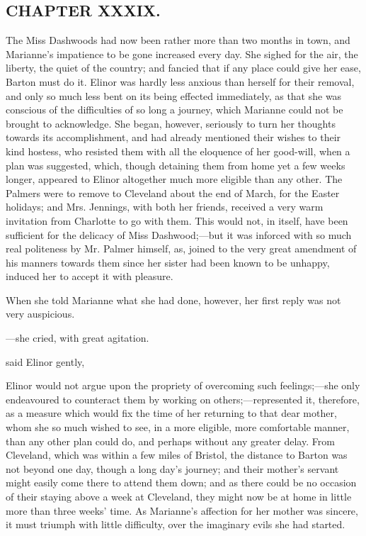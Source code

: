 \subsection[chapter-xxxix.]{\useURL[url39][][][]\from[url39]CHAPTER XXXIX.}

The Miss Dashwoods had now been rather more than two months in town, and Marianne's impatience to be gone increased every day. She sighed for the air, the liberty, the quiet of the country; and fancied that if any place could give her ease, Barton must do it. Elinor was hardly less anxious than herself for their removal, and only so much less bent on its being effected immediately, as that she was conscious of the difficulties of so long a journey, which Marianne could not be brought to acknowledge. She began, however, seriously to turn her thoughts towards its accomplishment, and had already mentioned their wishes to their kind hostess, who resisted them with all the eloquence of her good-will, when a plan was suggested, which, though detaining them from home yet a few weeks longer, appeared to Elinor altogether much more eligible than any other. The Palmers were to remove to Cleveland about the end of March, for the Easter holidays; and Mrs. Jennings, with both her friends, received a very warm invitation from Charlotte to go with them. This would not, in itself, have been sufficient for the delicacy of Miss Dashwood;---but it was inforced with so much real politeness by Mr. Palmer himself, as, joined to the very great amendment of his manners towards them since her sister had been known to be unhappy, induced her to accept it with pleasure.

When she told Marianne what she had done, however, her first reply was not very auspicious.

---she cried, with great agitation. 

 said Elinor gently, 


Elinor would not argue upon the propriety of overcoming such feelings;---she only endeavoured to counteract them by working on others;---represented it, therefore, as a measure which would fix the time of her returning to that dear mother, whom she so much wished to see, in a more eligible, more comfortable manner, than any other plan could do, and perhaps without any greater delay. From Cleveland, which was within a few miles of Bristol, the distance to Barton was not beyond one day, though a long day's journey; and their mother's servant might easily come there to attend them down; and as there could be no occasion of their staying above a week at Cleveland, they might now be at home in little more than three weeks' time. As Marianne's affection for her mother was sincere, it must triumph with little difficulty, over the imaginary evils she had started.

